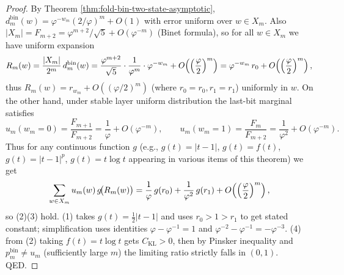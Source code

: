 \begin{proof}
By Theorem \ref{thm:fold-bin-two-state-asymptotic},
\(
d^{\mathrm{bin}}_m(w)=\varphi^{-w_m}(2/\varphi)^m+O(1)
\)
with error uniform over \(w\in X_m\).
Also \(|X_m|=F_{m+2}=\varphi^{m+2}/\sqrt5+O(\varphi^{-m})\) (Binet formula), so for all \(w\in X_m\) we have uniform expansion
\[
R_m(w)
=\frac{|X_m|}{2^m}\,d^{\mathrm{bin}}_m(w)
=\frac{\varphi^{m+2}}{\sqrt5}\cdot\frac{1}{\varphi^m}\cdot\varphi^{-w_m}+O\!\left(\Bigl(\frac{\varphi}{2}\Bigr)^m\right)
=\varphi^{-w_m}\,r_0+O\!\left(\Bigl(\frac{\varphi}{2}\Bigr)^m\right),
\]
thus \(R_m(w)=r_{w_m}+O((\varphi/2)^m)\) (where \(r_{0}=r_0,r_{1}=r_1\)) uniformly in \(w\).
On the other hand, under stable layer uniform distribution the last-bit marginal satisfies
\[
u_m(w_m=0)=\frac{F_{m+1}}{F_{m+2}}=\frac{1}{\varphi}+O(\varphi^{-m}),
\qquad
u_m(w_m=1)=\frac{F_{m}}{F_{m+2}}=\frac{1}{\varphi^2}+O(\varphi^{-m}).
\]
Thus for any continuous function \(g\) (e.g., \(g(t)=|t-1|\), \(g(t)=f(t)\), \(g(t)=|t-1|^p\), \(g(t)=t\log t\) appearing in various items of this theorem) we get
\[
\sum_{w\in X_m}u_m(w)\,g\!\bigl(R_m(w)\bigr)
=\frac{1}{\varphi}\,g(r_0)+\frac{1}{\varphi^2}\,g(r_1)+O\!\left(\Bigl(\frac{\varphi}{2}\Bigr)^m\right),
\]
so (2)(3) hold.
(1) takes \(g(t)=\frac12|t-1|\) and uses \(r_0>1>r_1\) to get stated constant; simplification uses identities
\(
\varphi-\varphi^{-1}=1
\)
and
\(
\varphi^{-2}-\varphi^{-1}=-\varphi^{-3}
\).
(4) from (2) taking \(f(t)=t\log t\) gets \(C_{\mathrm{KL}}>0\), then by Pinsker inequality and \(p^{\mathrm{bin}}_m\neq u_m\) (sufficiently large \(m\)) the limiting ratio strictly falls in \((0,1)\).
QED.
\end{proof}


